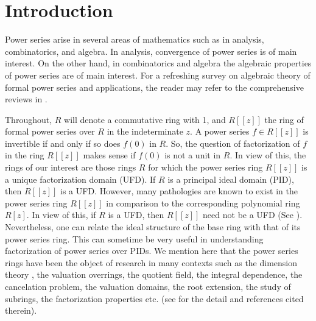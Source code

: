 \documentclass[12pt,reqno]{amsart}%
\begin{document}
\section{Introduction}
Power series arise in several areas of mathematics such as in analysis, combinatorics, and algebra. In analysis, convergence of power series is of main interest. On the other hand, in combinatorics and algebra the algebraic properties of power series are of main interest. For a refreshing survey on algebraic theory of formal power series and applications, the reader may refer to  the comprehensive reviews in \cite{Niven,Sambale}.

Throughout, $R$ will denote a commutative ring with 1, and $R[[z]]$ the ring of formal power series over $R$ in the indeterminate $z$. A power series $f\in R[[z]]$  is invertible if and only if so does $f(0)$ in $R$. So, the question of factorization of $f$ in the ring $R[[z]]$ makes sense if $f(0)$ is not a unit in $R$. In view of this, the rings of our interest are those rings $R$ for which  the power series ring $R[[z]]$ is a unique factorization domain (UFD). If $R$ is a principal ideal domain (PID), then $R[[z]]$ is a UFD. However, many pathologies are known to exist in the power series ring $R[[z]]$ in comparison to the corresponding polynomial ring $R[z]$. In view of this, if $R$  is a UFD, then $R[[z]]$ need not be a UFD (See \cite{Samuel1961,Brewer}). Nevertheless, one can relate the ideal structure of the base ring with that of its power series ring. This can sometime be very useful in understanding factorization of power series over PIDs. We mention here that the power series rings have been the object of research in many contexts such as the dimension theory \cite{Arnold1,Arnold2,Park1,Park2}, the valuation overrings, the quotient field, the integral dependence, the cancelation problem, the valuation domains, the root extension, the study of subrings, the factorization properties etc. (see for the detail \cite{Gilmer,Brewer,Park3,Toan,Park4,Chang21,Gilmer2,A24,Hizem24} and references cited therein).
\end{document}
